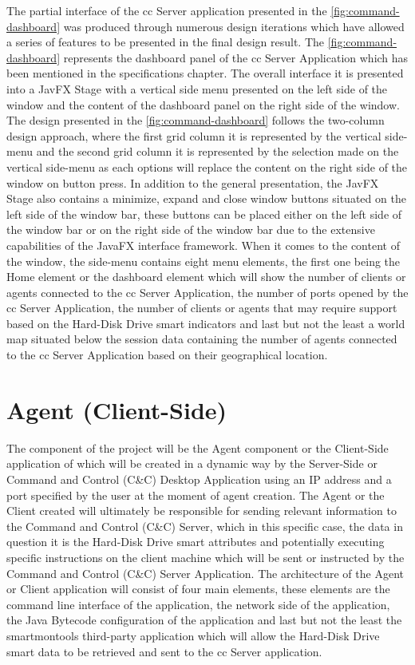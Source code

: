 The partial interface of the \acrfull{cc} Server application presented in the \ref{fig:command-dashboard}
was produced through numerous design iterations which have allowed a series of features
to be presented in the final design result. The \ref{fig:command-dashboard} represents
the dashboard panel of the \acrfull{cc} Server Application which has been mentioned in the
specifications chapter. The overall interface it is presented into a JavFX Stage with
a vertical side menu presented on the left side of the window and the content of the
dashboard panel on the right side of the window. The design presented in the \ref{fig:command-dashboard}
follows the two-column design approach, where the first grid column it is represented by the
vertical side-menu and the second grid column it is represented by the selection made
on the vertical side-menu as each options will replace the content on the right side
of the window on button press. In addition to the general presentation, the JavFX Stage
also contains a minimize, expand and close window buttons situated on the left side of
the window bar, these buttons can be placed either on the left side of the window bar
or on the right side of the window bar due to the extensive capabilities of the JavaFX
interface framework. When it comes to the content of the window, the side-menu contains
eight menu elements, the first one being the Home element or the dashboard element which
will show the number of clients or agents connected to the \acrfull{cc} Server Application,
the number of ports opened by the \acrfull{cc} Server Application, the number of clients
or agents that may require support based on the Hard-Disk Drive \acrfull{smart}
indicators and last but not the least a world map situated below the session data
containing the number of agents connected to the \acrfull{cc} Server Application based
on their geographical location.

\newpage

\section{Agent (Client-Side)}

The component of the project will be the Agent component or the Client-Side application of which
will be created in a dynamic way by the Server-Side or Command and Control (C\&C) Desktop Application
using an IP address and a port specified by the user at the moment of agent creation.
The Agent or the Client created will ultimately be responsible for sending relevant information to
the Command and Control (C\&C) Server, which in this specific case, the data in question it is the
Hard-Disk Drive \acrfull{smart} attributes and potentially executing specific instructions on the client
machine which will be sent or instructed by the Command and Control (C\&C) Server Application.
The architecture of the Agent or Client application will consist of four main elements, these elements are the command
line interface of the application, the network side of the application, the Java Bytecode
configuration of the application and last but not the least the smartmontools third-party application
which will allow the Hard-Disk Drive \acrfull{smart} data to be retrieved and sent to the
\acrfull{cc} Server application.

